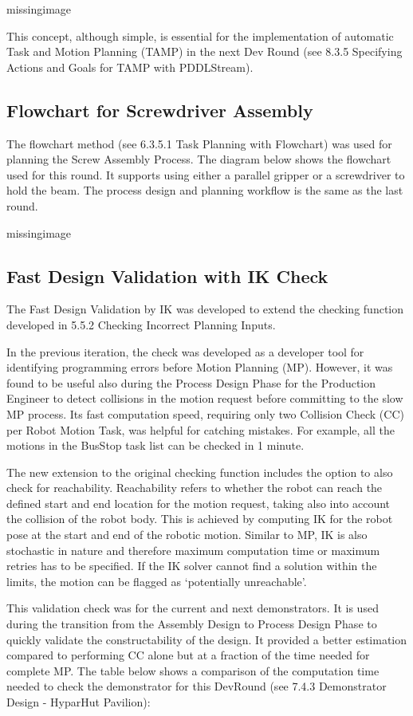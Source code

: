missingimage

This concept, although simple, is essential for the implementation of automatic Task and Motion Planning (TAMP) in the next Dev Round (see 8.3.5 Specifying Actions and Goals for TAMP with PDDLStream).

\subsection{Flowchart for Screwdriver Assembly}

The flowchart method (see 6.3.5.1 Task Planning with Flowchart) was used for planning the Screw Assembly Process. The diagram below shows the flowchart used for this round. It supports using either a parallel gripper or a screwdriver to hold the beam. The process design and planning workflow is the same as the last round.

missingimage

\subsection{Fast Design Validation with IK Check}
The Fast Design Validation by IK was developed to extend the checking function developed in 5.5.2 Checking Incorrect Planning Inputs. 

In the previous iteration, the check was developed as a developer tool for identifying programming errors before Motion Planning (MP). However, it was found to be useful also during the Process Design Phase for the Production Engineer to detect collisions in the motion request before committing to the slow MP process. Its fast computation speed, requiring only two Collision Check (CC) per Robot Motion Task, was helpful for catching mistakes. For example, all the motions in the BusStop task list can be checked in 1 minute. 

The new extension to the original checking function includes the option to also check for reachability. Reachability refers to whether the robot can reach the defined start and end location for the motion request, taking also into account the collision of the robot body. This is achieved by computing IK for the robot pose at the start and end of the robotic motion. Similar to MP, IK is also stochastic in nature and therefore maximum computation time or maximum retries has to be specified. If the IK solver cannot find a solution within the limits, the motion can be flagged as ‘potentially unreachable’.

This validation check was for the current and next demonstrators. It is used during the transition from the Assembly Design to Process Design Phase to quickly validate the constructability of the design. It provided a better estimation compared to performing CC alone but at a fraction of the time needed for complete MP. The table below shows a comparison of the computation time needed to check the demonstrator for this DevRound (see 7.4.3 Demonstrator Design  - HyparHut Pavilion):

